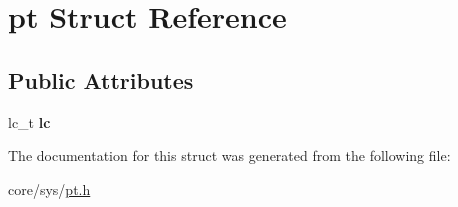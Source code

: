 \hypertarget{structpt}{\section{pt Struct Reference}
\label{structpt}
}
\subsection*{Public Attributes}
\begin{DoxyCompactItemize}
\item 
\hypertarget{structpt_ac3fa0fa86689e3e7c039a16c16861dbe}{lc\-\_\-t {\bfseries lc}}\label{structpt_ac3fa0fa86689e3e7c039a16c16861dbe}

\end{DoxyCompactItemize}


The documentation for this struct was generated from the following file\-:\begin{DoxyCompactItemize}
\item 
core/sys/\hyperlink{pt_8h}{pt.\-h}\end{DoxyCompactItemize}
